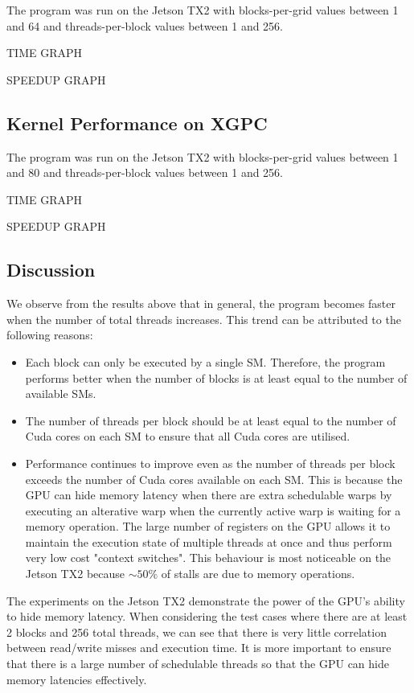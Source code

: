 \documentclass[a4paper,12pt]{article}
\begin{document}
The program was run on the Jetson TX2 with blocks-per-grid values between 1 and 64 and threads-per-block values between 1 and 256.

TIME GRAPH

SPEEDUP GRAPH

\subsection{Kernel Performance on XGPC}
The program was run on the Jetson TX2 with blocks-per-grid values between 1 and 80 and threads-per-block values between 1 and 256.

TIME GRAPH

SPEEDUP GRAPH

\subsection{Discussion}
We observe from the results above that in general, the program becomes faster when the number of total threads increases. This trend can be attributed to the following reasons:
\begin{itemize}
  \item Each block can only be executed by a single SM. Therefore, the program performs better when the number of blocks is at least equal to the number of available SMs.
  \item The number of threads per block should be at least equal to the number of Cuda cores on each SM to ensure that all Cuda cores are utilised.
  \item Performance continues to improve even as the number of threads per block exceeds the number of Cuda cores available on each SM. This is because the GPU can hide memory latency when there are extra schedulable warps by executing an alterative warp when the currently active warp is waiting for a memory operation. The large number of registers on the GPU allows it to maintain the execution state of multiple threads at once and thus perform very low cost "context switches". This behaviour is most noticeable on the Jetson TX2 because $\sim 50\%$ of stalls are due to memory operations.
\end{itemize}


The experiments on the Jetson TX2 demonstrate the power of the GPU's ability to hide memory latency. When considering the test cases where there are at least 2 blocks and 256 total threads, we can see that there is very little correlation between read/write misses and execution time. It is more important to ensure that there is a large number of schedulable threads so that the GPU can hide memory latencies effectively.
\end{document}
